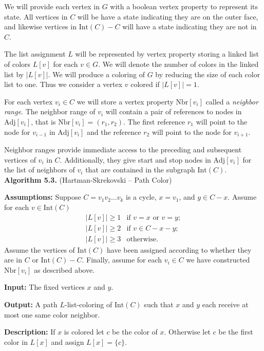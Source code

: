 \documentclass[letterpaper, 12pt]{article}
\theoremstyle{definition}
\theoremstyle{definition}
\theoremstyle{thm}
\theoremstyle{definition}
\begin{document}
We will provide each vertex in $G$ with a boolean vertex property to represent
its state. All vertices in $C$ will be have a state indicating they are on the
outer face, and likewise vertices in $\text{Int}(C)-C$ will have a state
indicating they are not in $C$.

The list assignment $L$ will be represented by vertex property storing a linked
list of colors $L[v]$ for each $v\in G$. We will denote the number of colors
in the linked list by $|L[v]|$. We will produce a coloring of $G$ by reducing
the size of each color list to one. Thus we consider a vertex $v$
colored if $|L[v]|=1$.

For each vertex $v_i\in C$ we will store a vertex property $\text{Nbr}[v_i]$
called a \textit{neighbor range}. The neighbor range of $v_i$ will contain a pair of
references to nodes in $\text{Adj}[v_i]$, that is $\text{Nbr}[v_i]=(r_1,r_2)$.
The first reference $r_1$ will point to the
node for $v_{i-1}$ in $\text{Adj}[v_i]$ and the reference $r_2$ will point to
the node for $v_{i+1}$.

Neighbor ranges provide immediate access to the preceding and subsequent
vertices of $v_i$ in $C$. Additionally, they give start and stop nodes in
$\text{Adj}[v_i]$ for the list of neighbors of $v_i$ that are contained in the
subgraph $\text{Int}(C)$.\\

\noindent\textbf{Algorithm 5.3.} (Hartman-Skrekovski -- Path Color)

\noindent\textbf{Assumptions:} Suppose $C=v_1v_2\ldots v_k$ is a cycle, $x=v_1$,
and $y\in C-x$. Assume for each $v\in \text{Int}(C)$
\[
    \begin{array}{ll}
	    |L[v]|\ge 1 & \text{if } v=x \text{ or } v=y;\\
	    |L[v]|\ge 2 & \text{if } v\in C-x-y;\\
	    |L[v]|\ge 3 & \text{otherwise.}
    \end{array}
\]
Assume the vertices of
$\text{Int}(C)$ have been assigned according to whether they are in $C$ or
$\text{Int}(C)-C$. Finally, assume for each $v_i\in C$ we have constructed
$\text{Nbr}[v_i]$ as described above.

\noindent\textbf{Input:} The fixed vertices $x$ and $y$.

\noindent\textbf{Output:} A path $L$-list-coloring of $\text{Int}(C)$ such that
$x$ and $y$ each receive at most one same color neighbor.

\noindent\textbf{Description:} If $x$ is colored let $c$ be the color of $x$.
Otherwise let $c$ be the first color in $L[x]$ and assign
$L[x]=\{c\}$.
\end{document}
